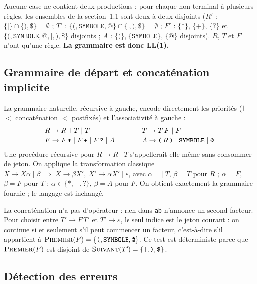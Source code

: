 \documentclass[12pt,a4paper]{article}
\newcommand{\code}[1]{{\fontsize{10}{12}\selectfont\texttt{#1}}}
\newcommand{\Prem}{\textsc{Premier}}
\newcommand{\Suiv}{\textsc{Suivant}}
\newcommand{\tok}[1]{\ensuremath{\text{\fontsize{10}{12}\selectfont\ttfamily #1}}}
\begin{document}
Aucune case ne contient deux productions : pour chaque non-terminal à plusieurs règles, les
ensembles de la section~1.1 sont deux à deux disjoints
($R'$ : $\{\texttt{|}\} \cap \{\texttt{)}, \texttt{\$}\} = \emptyset$ ;
$T'$ : $\{\texttt{(}, \texttt{SYMBOLE}, \texttt{@}\} \cap \{\texttt{|}, \texttt{)}, \texttt{\$}\} = \emptyset$ ;
$F'$ : $\{\texttt{*}\}$, $\{\texttt{+}\}$, $\{\texttt{?}\}$ et
$\{\texttt{(}, \texttt{SYMBOLE}, \texttt{@}, \texttt{|}, \texttt{)}, \texttt{\$}\}$ disjoints ;
$A$ : $\{\texttt{(}\}$, $\{\texttt{SYMBOLE}\}$, $\{\texttt{@}\}$ disjoints).
$R$, $T$ et $F$ n'ont qu'une règle. \textbf{La grammaire est donc LL(1).}

\subsection{Grammaire de départ et concaténation implicite}

La grammaire naturelle, récursive à gauche, encode directement les priorités
(\tok{|} $<$ concaténation $<$ postfixés) et l'associativité à gauche :
\[
\begin{array}{l@{\qquad\qquad}l}
R \to R \;\texttt{|}\; T \mid T & T \to T\,F \mid F\\[2pt]
F \to F\,\texttt{*} \mid F\,\texttt{+} \mid F\,\texttt{?} \mid A &
A \to \texttt{(}\,R\,\texttt{)} \mid \texttt{SYMBOLE} \mid \texttt{@}
\end{array}
\]
Une procédure récursive pour $R \to R \;\texttt{|}\; T$ s'appellerait elle-même sans consommer
de jeton. On applique la transformation classique
$X \to X\alpha \mid \beta \;\Rightarrow\; X \to \beta X',\ X' \to \alpha X' \mid \varepsilon$,
avec $\alpha = \texttt{|}\,T$, $\beta = T$ pour $R$ ; $\alpha = F$, $\beta = F$ pour $T$ ;
$\alpha \in \{\texttt{*}, \texttt{+}, \texttt{?}\}$, $\beta = A$ pour $F$. On obtient exactement
la grammaire fournie ; le langage est inchangé.

La concaténation n'a pas d'opérateur : rien dans \code{ab} n'annonce un second facteur. Pour
choisir entre $T' \to F\,T'$ et $T' \to \varepsilon$, le seul indice est le jeton courant : on
continue si et seulement s'il peut commencer un facteur, c'est-à-dire s'il appartient à
$\Prem(F) = \{\texttt{(}, \texttt{SYMBOLE}, \texttt{@}\}$. Ce test est déterministe parce que
$\Prem(F)$ est disjoint de $\Suiv(T') = \{\texttt{|}, \texttt{)}, \texttt{\$}\}$.

\subsection{Détection des erreurs}
\end{document}
